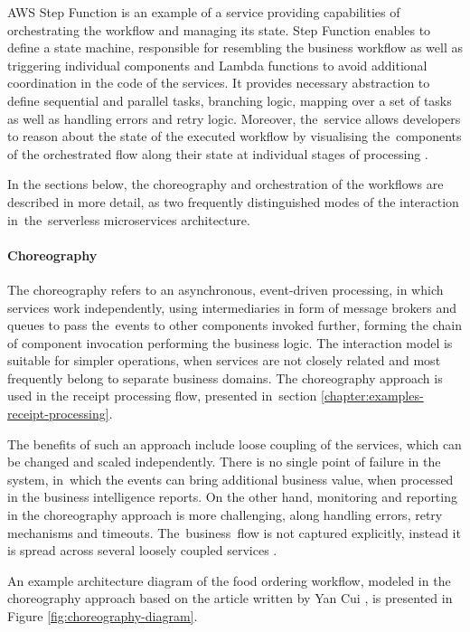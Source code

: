 AWS Step Function is an example of a service providing capabilities of orchestrating the workflow and managing its state.
Step Function enables to define a state machine, responsible for resembling the business workflow as well as triggering individual components and Lambda functions to avoid additional coordination in the code of the services.
It provides necessary abstraction to define sequential and parallel tasks, branching logic, mapping over a set of tasks as well as handling errors and retry logic.
Moreover, the~service allows developers to reason about the state of the executed workflow by visualising the~components of the orchestrated flow along their state at individual stages of processing \cite{ImplementingMicroservicesOnAWS}.

In the sections below, the choreography and orchestration of the workflows are described in more detail, as two frequently distinguished modes of the interaction in~the~serverless microservices architecture.

\paragraph{Choreography}

The choreography refers to an asynchronous, event-driven processing, in which services work independently, using intermediaries in form of message brokers and queues to pass the~events to other components invoked further, forming the chain of component invocation performing the business logic.
The interaction model is suitable for simpler operations, when services are not closely related and most frequently belong to separate business domains.
The choreography approach is used in the receipt processing flow, presented in~section \ref{chapter:examples-receipt-processing}.

The benefits of such an approach include loose coupling of the services, which can be changed and scaled independently. There is no single point of failure in the system, in~which the events can bring additional business value, when processed in the business intelligence reports.
On the other hand, monitoring and reporting in the choreography approach is more challenging, along handling errors, retry mechanisms and timeouts. The~business~flow is not captured explicitly, instead it is spread across several loosely coupled services \cite{ChoreographyVsOrchestrationInServerlessMicroservices}.

An example architecture diagram of the food ordering workflow, modeled in the choreography approach based on the article written by Yan Cui \cite{ChoreographyVsOrchestrationInTheLandOfServerless}, is presented in Figure \ref{fig:choreography-diagram}.

